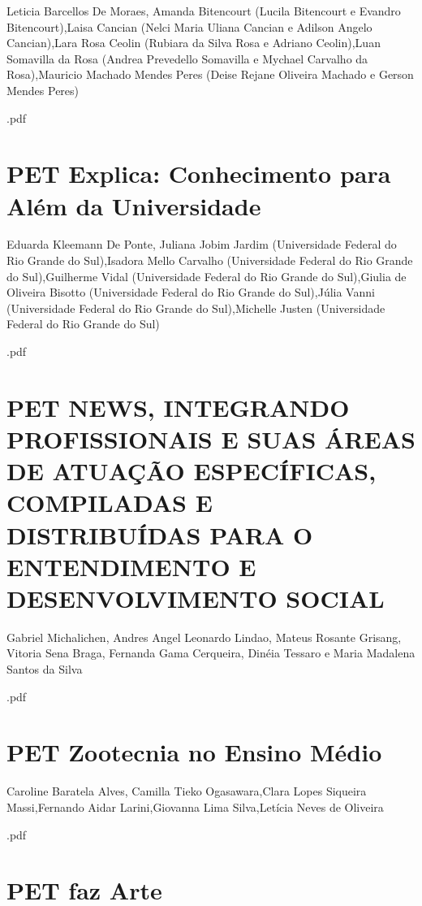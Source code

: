 Leticia Barcellos De Moraes, Amanda Bitencourt (Lucila Bitencourt e Evandro Bitencourt),Laisa Cancian (Nelci Maria Uliana Cancian e Adilson Angelo Cancian),Lara Rosa Ceolin (Rubiara da Silva Rosa e Adriano Ceolin),Luan Somavilla da Rosa (Andrea Prevedello Somavilla e Mychael Carvalho da Rosa),Mauricio Machado Mendes Peres (Deise Rejane Oliveira Machado e Gerson Mendes Peres)



.pdf\section{PET Explica: Conhecimento para Além da Universidade}

Eduarda Kleemann De Ponte, Juliana Jobim Jardim (Universidade Federal do Rio Grande do Sul),Isadora Mello Carvalho (Universidade Federal do Rio Grande do Sul),Guilherme Vidal (Universidade Federal do Rio Grande do Sul),Giulia de Oliveira Bisotto (Universidade Federal do Rio Grande do Sul),Júlia Vanni (Universidade Federal do Rio Grande do Sul),Michelle Justen (Universidade Federal do Rio Grande do Sul)



.pdf\section{PET NEWS, INTEGRANDO PROFISSIONAIS E SUAS ÁREAS DE ATUAÇÃO ESPECÍFICAS, COMPILADAS E DISTRIBUÍDAS PARA O ENTENDIMENTO E DESENVOLVIMENTO SOCIAL}

Gabriel Michalichen, Andres Angel Leonardo Lindao, Mateus Rosante Grisang, Vitoria Sena Braga, Fernanda Gama Cerqueira, Dinéia Tessaro e Maria Madalena Santos da Silva



.pdf\section{PET Zootecnia no Ensino Médio}

Caroline Baratela Alves, Camilla Tieko Ogasawara,Clara Lopes Siqueira Massi,Fernando Aidar Larini,Giovanna Lima Silva,Letícia Neves de Oliveira



.pdf\section{PET faz Arte}

